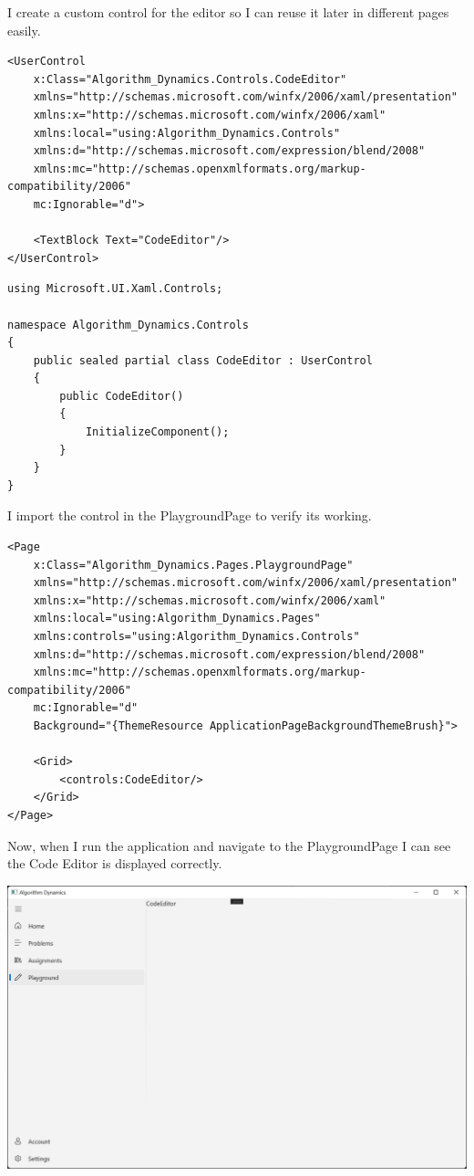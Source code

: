 \documentclass[a4paper]{report}
\begin{document}
I create a custom control for the editor so I can reuse it later in different pages easily.

\begin{verbatim}
<UserControl
    x:Class="Algorithm_Dynamics.Controls.CodeEditor"
    xmlns="http://schemas.microsoft.com/winfx/2006/xaml/presentation"
    xmlns:x="http://schemas.microsoft.com/winfx/2006/xaml"
    xmlns:local="using:Algorithm_Dynamics.Controls"
    xmlns:d="http://schemas.microsoft.com/expression/blend/2008"
    xmlns:mc="http://schemas.openxmlformats.org/markup-compatibility/2006"
    mc:Ignorable="d">

    <TextBlock Text="CodeEditor"/>
</UserControl>
\end{verbatim}

\begin{verbatim}
using Microsoft.UI.Xaml.Controls;

namespace Algorithm_Dynamics.Controls
{
    public sealed partial class CodeEditor : UserControl
    {
        public CodeEditor()
        {
            InitializeComponent();
        }
    }
}
\end{verbatim}

I import the control in the PlaygroundPage to verify its working.

\begin{verbatim}
<Page
    x:Class="Algorithm_Dynamics.Pages.PlaygroundPage"
    xmlns="http://schemas.microsoft.com/winfx/2006/xaml/presentation"
    xmlns:x="http://schemas.microsoft.com/winfx/2006/xaml"
    xmlns:local="using:Algorithm_Dynamics.Pages"
    xmlns:controls="using:Algorithm_Dynamics.Controls"
    xmlns:d="http://schemas.microsoft.com/expression/blend/2008"
    xmlns:mc="http://schemas.openxmlformats.org/markup-compatibility/2006"
    mc:Ignorable="d"
    Background="{ThemeResource ApplicationPageBackgroundThemeBrush}">

    <Grid>
        <controls:CodeEditor/>
    </Grid>
</Page>
\end{verbatim}

Now, when I run the application and navigate to the PlaygroundPage I can see the Code Editor is displayed correctly.

\includegraphics[width=\textwidth, height=\textheight, keepaspectratio]{CodeEditorControl}
\end{document}
